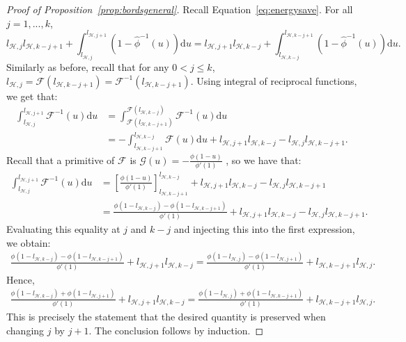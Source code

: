 \documentclass[11pt]{article}
\begin{document}
\begin{proof}[Proof of Proposition~\ref{prop:bordsgeneral}]
    Recall Equation~\eqref{eq:energysave}. For all $j=1,..., k$, 
     \begin{equation*}
        l_{\mathcal{H},j}l_{\mathcal{H},k-j+1}+ \int_{l_{\mathcal{H},j}}^{l_{\mathcal{H},j+1}}(1-\hat{\phi}^{-1}(u))\mathrm{d}u = l_{\mathcal{H},j+1}l_{\mathcal{H},k-j} + \int_{l_{\mathcal{H},k-j}}^{l_{\mathcal{H},k-j+1}}(1-\hat{\phi}^{-1}(u))\mathrm{d}u. 
    \end{equation*}
    Similarly as before, recall that for any $ 0 <j\leq k$, $l_{\mathcal{H},j}=\mathcal{F}(l_{\mathcal{H},k-j+1})=\mathcal{F}^{-1}(l_{\mathcal{H},k-j+1})$. Using integral of reciprocal functions, we get that:
    \begin{align*}
    \int_{l_{\mathcal{H},j}}^{l_{\mathcal{H},j+1}}\mathcal{F}^{-1}(u)\mathrm{d}u &= \int_{\mathcal{F}(l_{\mathcal{H},k-j+1})}^{\mathcal{F}(l_{\mathcal{H},k-j})} \mathcal{F}^{-1}(u)\mathrm{d}u \\
    &=-\int_{l_{\mathcal{H},k-j+1}}^{l_{\mathcal{H},k-j}}\mathcal{F}(u)\mathrm{d}u+l_{\mathcal{H},j+1}l_{\mathcal{H},k-j}-l_{\mathcal{H},j}l_{\mathcal{H},k-j+1}.
    \end{align*}
    Recall that a primitive of $\mathcal{F}$ is $\mathcal{G}(u)=-\frac{\phi(1-u)}{\phi'(1)}$ , so we have that:
    \begin{align*}
    \int_{l_{\mathcal{H},j}}^{l_{\mathcal{H},j+1}}\mathcal{F}^{-1}(u)\mathrm{d}u &= \left[ \frac{\phi(1-u)}{\phi'(1)} \right]_{l_{\mathcal{H},k-j+1}}^{l_{\mathcal{H},k-j}} +l_{\mathcal{H},j+1}l_{\mathcal{H},k-j}-l_{\mathcal{H},j}l_{\mathcal{H},k-j+1} \\
    &= \frac{\phi(1-l_{\mathcal{H},k-j})-\phi(1-l_{\mathcal{H},k-j+1})}{\phi'(1)}+l_{\mathcal{H},j+1}l_{\mathcal{H},k-j}-l_{\mathcal{H},j}l_{\mathcal{H},k-j+1}. 
    \end{align*}
Evaluating this equality at $j$ and $k-j$ and injecting this into the first expression, we obtain:
\begin{align*}
    \frac{\phi(1-l_{\mathcal{H},k-j})-\phi(1-l_{\mathcal{H},k-j+1})}{\phi'(1)} + l_{\mathcal{H},j+1}l_{\mathcal{H},k-j} = \frac{\phi(1-l_{\mathcal{H},j})-\phi(1-l_{\mathcal{H},j+1})}{\phi'(1)} +l_{\mathcal{H},k-j+1}l_{\mathcal{H},j}.
\end{align*}
Hence,
\begin{align*}
    \frac{\phi(1-l_{\mathcal{H},k-j})+\phi(1-l_{\mathcal{H},j+1})}{\phi'(1)} + l_{\mathcal{H},j+1}l_{\mathcal{H},k-j} = \frac{\phi(1-l_{\mathcal{H},j})+\phi(1-l_{\mathcal{H},k-j+1})}{\phi'(1)} +l_{\mathcal{H},k-j+1}l_{\mathcal{H},j}.
\end{align*}
This is precisely the statement that the desired quantity is preserved when changing $j$ by $j+1$. The conclusion follows by induction.
\end{proof}
\end{document}
